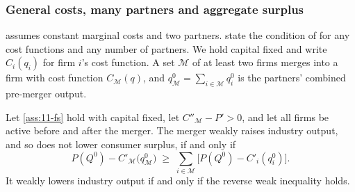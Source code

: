 \subsubsection{General costs, many partners and aggregate surplus}

 assumes constant marginal costs and two partners. \citet[p.~229, eq.~(6)]{AskerNocke2021}
state the condition of \citet{FarrellShapiro1990} for any cost functions and any number of partners. We hold capital
fixed and write $C_i(q_i)$ for firm $i$'s cost function. A set $\mathcal{M}$ of at least two firms merges into a firm
with cost function $C_{\mathcal{M}}(q)$, and $q_{\mathcal{M}}^0 = \sum_{i \in \mathcal{M}} q_i^0$ is the partners'
combined pre-merger output.

\begin{proposition}\label{prop:11-synergy-gen}
Let \cref{ass:11-fs} hold with capital fixed, let $C''_{\mathcal{M}} - P' > 0$, and let all firms be active before
and after the merger. The merger weakly raises industry output, and so does not lower consumer surplus, if and only
if
\begin{equation}\label{eq:11-an6}
P(Q^0) - C'_{\mathcal{M}}\big(q_{\mathcal{M}}^0\big) \;\ge\; \sum_{i \in \mathcal{M}}\big[P(Q^0) - C'_i(q_i^0)\big].
\end{equation}
It weakly lowers industry output if and only if the reverse weak inequality holds.
\end{proposition}


